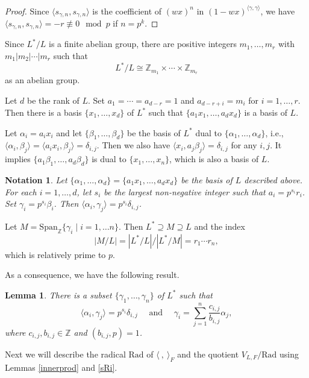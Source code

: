 \documentclass[12pt]{article}
\def\ZZ{{\mathbb Z}}
\newtheorem{lem}[thm]{Lemma}
\newtheorem{nota}[thm]{Notation}
\begin{document}
\begin{proof}
Since $\langle s_{\gamma,n}, s_{\gamma,n}\rangle $
is the coefficient of $(wx)^n$ in $(1-wx)^{\langle \gamma, \gamma\rangle}$, 
we have $\langle s_{\gamma,n}, s_{\gamma,n}\rangle =-r \not \equiv 0 \mod p$ if $n=p^k$.  
\end{proof}



Since $L^*/L$ is a finite abelian group, there are positive integers  $m_1, \dots, m_r$ with 
$m_1|m_2|\cdots |m_r$ such that 
\[
L^*/L \cong \ZZ_{m_1}\times \cdots \times \ZZ_{m_r}
\]
as an abelian group. 


  Let $d$ be the rank of $L$. Set $a_1=\cdots= a_{d-r}=1$ and $a_{d-r+i}=m_i$ for $i=1,\dots,r$.  Then there is a basis  $\{x_1, \dots, x_d\}$ of $L^*$ such that  $\{a_1x_1, \dots, a_d x_d\}$ is a basis of $L$. 


Let $\alpha_i=a_ix_i$ and let  $\{\beta_1, \dots, \beta_d\}$ be the  basis of $L^*$ dual to $ \{ \alpha_1, \dots, \alpha_d\}$, i.e., $\langle \alpha_i,\beta_j\rangle=\langle a_i x_i ,\beta_j\rangle =\delta_{i,j}$. 
Then we also have $\langle  x_i ,a_j\beta_j\rangle =\delta_{i,j}$ for any $i,j$. 
It implies $ \{ a_1\beta_1, \dots, a_d \beta_d\}$
is dual to $\{x_1, \dots ,x_n\}$, which is also a basis of $L$. 

\begin{nota} \label{si}
Let $ \{ \alpha_1, \dots, \alpha_d\} = \{a_1x_1, \dots, a_dx_d\}$ be the basis of $L$ described above.  For each $i=1, \dots, d$, let $s_i$ be the largest non-negative integer such that $a_i=p^{s_i}r_i$.  
Set  $\gamma_i= p^{s_i} \beta_i$. Then $ \langle \alpha_i, \gamma_j\rangle = p^{s_i} \delta_{i,j} $. 
\end{nota} 

Let $M=\mathrm{Span}_\ZZ\{ \gamma_i\mid i=1, \dots n\}$. Then $L^*\supseteq  M\supseteq L$ and the index 
\[
|M/L| = |L^*/L| / |L^*/M| = r_1\cdots r_n,
\]
which is relatively  prime to $p$. 

As a consequence, we have the following result. 
\begin{lem}
There is a subset $\{\gamma_1, \dots, \gamma_n\}$ of $L^*$ such that 
\[
\langle \alpha_i, \gamma_j\rangle =p^{s_i} \delta_{i,j}\quad \text{ and }\quad  \gamma_i =\sum_{j=1}^n  \frac{c_{i,j}}{b_{i,j}} \alpha_j, 
\]
where $c_{i,j}, b_{i,j} \in \ZZ$ and $(b_{i,j}, p)=1$. 
\end{lem}


Next we will describe the radical $\mathrm{Rad}$ of $\langle\ , \ \rangle_F$  and  the quotient $V_{L,F}/\mathrm{Rad}$ using Lemmas \ref{innerprod} and \ref{sRi}. 
\end{document}
